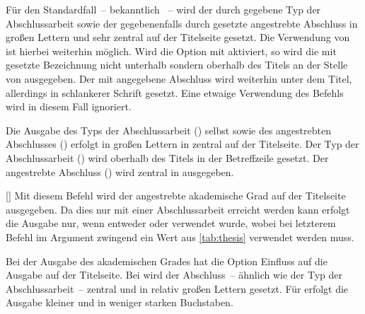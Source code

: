 \begin{Declaration*}{}
\begin{Declaration*}{}
\begin{Declaration*}{}
\begin{Declaration}{}
Für den Standardfall~-- bekanntlich ~-- wird der 
durch  gegebene Typ der Abschlussarbeit sowie der gegebenenfalls 
durch  gesetzte angestrebte Abschluss in großen Lettern und 
sehr zentral auf der Titelseite gesetzt. Die Verwendung von  ist 
hierbei weiterhin möglich.
%
Wird die Option mit  aktiviert, so wird die mit 
 gesetzte Bezeichnung nicht unterhalb sondern oberhalb des Titels 
an der Stelle von  ausgegeben. Der mit  
angegebene Abschluss wird weiterhin unter dem Titel, allerdings in schlankerer 
Schrift gesetzt. Eine etwaige Verwendung des Befehls  wird in 
diesem Fall ignoriert.
%
\begin{values}{}
\itemfalse
  Die Ausgabe des Typs der Abschlussarbeit () selbst sowie des 
  angestrebten Abschlusses () erfolgt in großen Lettern in 
  \DIN zentral auf der Titelseite.
\itemtrue*
  Der Typ der Abschlussarbeit () wird oberhalb des Titels in der 
  Betreffzeile gesetzt. Der angestrebte Abschluss () wird 
  zentral in \Univers ausgegeben.
\end{values}
\end{Declaration}

\begin{Declaration}[v2.02]{%
  []%
}
\printdeclarationlist%
%
Mit diesem Befehl wird der angestrebte akademische Grad auf der Titelseite 
ausgegeben. Da dies nur mit einer Abschlussarbeit erreicht werden kann erfolgt 
die Ausgabe nur, wenn entweder  oder  verwendet 
wurde, wobei bei letzterem Befehl im Argument zwingend ein Wert aus 
\autoref{tab:thesis} verwendet werden muss.

Bei der Ausgabe des akademischen Grades hat die Option  
Einfluss auf die Ausgabe auf der Titelseite. Bei  
wird der Abschluss~-- ähnlich wie der Typ der Abschlussarbeit~-- zentral und in 
relativ großen Lettern gesetzt. Für  erfolgt die 
Ausgabe kleiner und in weniger starken Buchstaben.
\end{Declaration}


\end{Declaration*}
\end{Declaration*}
\end{Declaration*}
